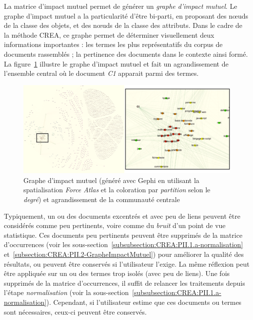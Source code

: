 \bigskip

La matrice d'impact mutuel permet de générer un \textit{graphe d'impact mutuel}.
Le graphe d'impact mutuel a la particularité d'être bi-parti, en proposant des n\oe{}uds de la classe des objets, et des n\oe{}uds de la classe des attributs.
Dans le cadre de la méthode CREA, ce graphe permet de déterminer visuellement deux informations importantes : les termes les plus représentatifs du corpus de documents rassemblés ; la pertinence des documents dans le contexte ainsi formé.
La figure~\ref{figure:2-S2-Metriques-ImpactMutuel-Graphe} illustre le graphe d'impact mutuel et fait un agrandissement de l'ensemble central où le document \textit{C1} apparait parmi des termes.

\begin{figure}[htb!]
\centering
\centerline{  %
\includegraphics[scale=0.6]{2-Etat-de-l'Art/images/ACF/Metriques/exemple_graphe.png}
}
\caption{Graphe d'impact mutuel (généré avec Gephi en utilisant la spatialisation \textit{Force Atlas} et la coloration par \textit{partition} selon le \textit{degré}) et agrandissement de la communauté centrale}
\label{figure:2-S2-Metriques-ImpactMutuel-Graphe}
\end{figure}

\bigskip

Typiquement, un ou des documents excentrés et avec peu de liens peuvent être considérés comme peu pertinents, voire comme du \textit{bruit} d'un point de vue statistique.
Ces documents peu pertinents peuvent être supprimés de la matrice d'occurrences (voir les sous-section~\ref{subsubsection:CREA:PII.1.a-normalisation} et~\ref{subsection:CREA:PII.2-GrapheImpactMutuel}) pour améliorer la qualité des résultats, ou peuvent être conservés si l'utilisateur l'exige.
La même réflexion peut être appliquée sur un ou des termes trop isolés (avec peu de liens).
Une fois supprimés de la matrice d'occurrences, il suffit de relancer les traitements depuis l'étape \textit{normalisation} (voir la sous-section~\ref{subsubsection:CREA:PII.1.a-normalisation}).
Cependant, si l'utilisateur estime que ces documents ou termes sont nécessaires, ceux-ci peuvent être conservés.


